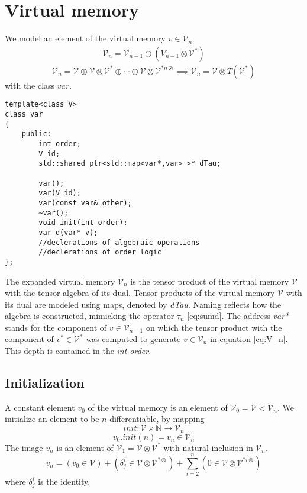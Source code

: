 \documentclass{article}
\newcommand{\VV}{\mathcal{V}}
\newcommand{\sumd}{\tau}
\begin{document}
\section{Virtual memory}

We model an element of the virtual memory $v\in\VV_n$ \cite[Claim~4.1]{OperationalCalculus}
\begin{eqnarray}
\VV_{n}=\VV_{n-1}\oplus(V_{n-1}\otimes\VV^*) \label{eq:V_n}
\end{eqnarray}
\begin{equation}
\VV_{n}=\VV\oplus\VV\otimes\VV^*\oplus\cdots\oplus\VV\otimes\VV^{*n\otimes} \implies\VV_n=\VV\otimes T(\VV^*)
\end{equation}
with the class $var$.

\begin{lstlisting}
template<class V>
class var
{
    public:
    	int order;
        V id;
        std::shared_ptr<std::map<var*,var> >* dTau;

        var();
        var(V id);
        var(const var& other);
        ~var();
        void init(int order);
        var d(var* v);
        //declerations of algebraic operations
        //declerations of order logic
};
\end{lstlisting}

The expanded virtual memory $\VV_n$ is the tensor product of the virtual memory $\VV$ with the tensor algebra of its dual. Tensor products of the virtual memory $\VV$ with its dual are modeled using maps, denoted by \emph{dTau}. Naming reflects how the algebra is constructed, mimicking the operator $\sumd_n$ \eqref{eq:sumd}. The address \emph{var*} stands for the component of $v\in\VV_{n-1}$ on which the tensor product with the component of $v^*\in\VV^*$ was computed to generate $v\in\VV_n$ in equation \eqref{eq:V_n}. This depth is contained in the \emph{int order}.

\subsection{Initialization}

A constant element $v_0$ of the virtual memory is an element of $\VV_0=\VV<\VV_n$. We initialize an element to be $n$-differentiable, by mapping
\begin{equation}
init:\VV\times\mathbb{N}\to\VV_n
\end{equation}
\begin{equation}
v_0.init(n)=v_n\in\VV_n
\end{equation}
The image $v_n$ is an element of $\VV_1=\VV\otimes\VV^*$ with natural inclusion in $\VV_n$.
\begin{equation}
v_n=(v_0\in\VV)+(\delta^i_j\in\VV\otimes\VV^ {*\otimes})+\sum\limits_{i=2}^n(0\in\VV\otimes\VV^ {*i\otimes})
\end{equation}
where $\delta^i_j$ is the identity.
\end{document}
